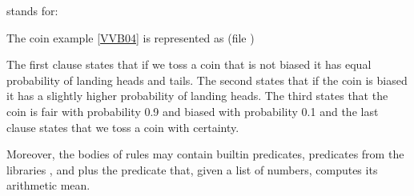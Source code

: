 \documentclass[letterpaper,10pt,english]{sphinxmanual}
\begin{document}
\sphinxAtStartPar
stands for:

\begin{sphinxVerbatim}[commandchars=\\\{\}]
  
\end{sphinxVerbatim}

\sphinxAtStartPar
The coin example {[}\hyperlink{cite.index:id50}{VVB04}{]} is represented as (file )

\begin{sphinxVerbatim}[commandchars=\\\{\}]
   

   

  

\end{sphinxVerbatim}

\sphinxAtStartPar
The first clause states that if we toss a coin that is not biased it has equal probability of landing heads and
tails.
The second states that if the coin is biased it has a slightly higher probability of landing heads.
The third states that the coin is fair with probability 0.9 and biased with probability 0.1 and the last clause
states that we toss a coin with certainty.

\sphinxAtStartPar
Moreover, the bodies of rules may contain built\sphinxhyphen{}in predicates, predicates from the libraries ,
 and  plus the predicate 
that, given a list of numbers, computes its arithmetic mean.
\end{document}
